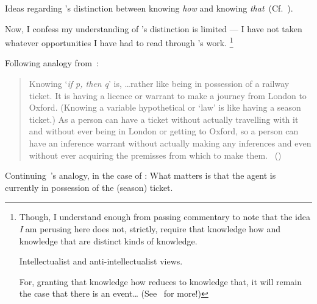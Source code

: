 \begin{note}
  Ideas regarding \citeauthor{Ryle:1946tu}'s distinction between knowing \emph{how} and knowing \emph{that}~(Cf.~\citeyear{Ryle:1946tu}).

  Now, I confess my understanding of \citeauthor{Ryle:1946tu}'s distinction is limited --- I have not taken whatever opportunities I have had to read through \citeauthor{Ryle:1946tu}'s work.%
  \footnote{
    Though, I understand enough from passing commentary to note that the idea \emph{I} am perusing here does not, strictly, require that knowledge how and knowledge that are distinct kinds of knowledge.

    Intellectualist and anti-intellectualist views.

    For, granting that knowledge how reduces to knowledge that, it will remain the case that there is an event\dots
    (See~\textcite{Pavese:2022up} for more!)
  }

  Following analogy from~\textcite{Ryle:2009us}:

  \begin{quote}
    Knowing `\emph{if p, then q}' is, \dots rather like being in possession of a railway ticket.
    It is having a licence or warrant to make a journey from London to Oxford.
    (Knowing a variable hypothetical or `law' is like having a season ticket.)
    As a person can have a ticket without actually travelling with it and without ever being in London or getting to Oxford, so a person can have an inference warrant without actually making any inferences and even without ever acquiring the premisses from which to make them.%
    \mbox{ }\hfill\mbox{(\citeyear[250]{Ryle:2009us})}
  \end{quote}

  Continuing~\citeauthor{Ryle:2009us}'s analogy, in the case of :
  What matters is that the agent is currently in possession of the (season) ticket.
\end{note}

